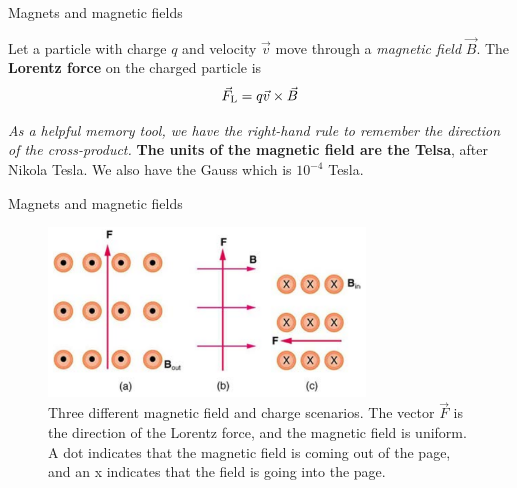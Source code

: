 \documentclass{beamer}
\begin{document}
\begin{frame}{Magnets and magnetic fields}
\begin{tcolorbox}[colback=white,colframe=black!100!black,title=The Lorentz Force]
\alert{Let a particle with charge $q$ and velocity $\vec{v}$ move through a \textit{magnetic field} $\vec{B}$.  The \textbf{Lorentz force} on the charged particle is
\begin{equation}
\vec{F}_{\rm L} = q\vec{v} \times \vec{B}
\label{eq:Lorentz}
\end{equation}}
\end{tcolorbox}
\textit{As a helpful memory tool, we have the right-hand rule to remember the direction of the cross-product.}  \textbf{The units of the magnetic field are the Telsa}, after Nikola Tesla.  We also have the Gauss which is $10^{-4}$ Tesla.
\end{frame}

\begin{frame}{Magnets and magnetic fields}
\begin{figure}
\centering
\includegraphics[width=0.75\textwidth]{figures/lorentzProblem.png}
\caption{\label{fig:lorentzProblem} Three different magnetic field and charge scenarios.  The vector $\vec{F}$ is the direction of the Lorentz force, and the magnetic field is uniform.  A dot indicates that the magnetic field is coming out of the page, and an x indicates that the field is going into the page.}
\end{figure}
\end{frame}
\end{document}
